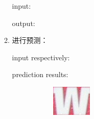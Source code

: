 \documentclass[a4paper]{article}
\begin{document}
\begin{enumerate}
\begin{enumerate}
        input:
        

        output:
        

        \item 进行预测：
        
        input respectively:
        
        
        prediction results:

        \begin{figure}[H]
	        \centering
	        \begin{subfigure}[b]{.3\linewidth}
	            \includegraphics[width=\linewidth]{HW1-release/data/character_classification/new_images/1_W.jpg}
	        \end{subfigure}
	        \hfill
	        \begin{subfigure}[b]{.05\linewidth}

\end{subfigure}
\end{figure}
\end{enumerate}
\end{enumerate}
\end{document}

